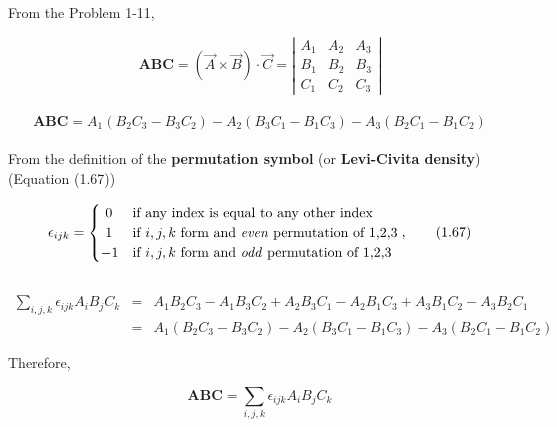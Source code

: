 \documentclass[a4paper]{article}
\begin{document}
\Large

From the Problem 1-11,

\begin{equation*}
	\mathbf{ABC} = (\vec{A} \times \vec{B}) \cdot \vec{C} = \left| \begin{array}{ccc} A_1 & A_2 & A_3 \\ B_1 & B_2 & B_3 \\ C_1 & C_2 & C_3 \end{array} \right|
\end{equation*}
\\
\begin{equation*}
	\mathbf{ABC} = A_1(B_2C_3-B_3C_2) - A_2(B_3C_1-B_1C_3) - A_3(B_2C_1-B_1C_2)
\end{equation*}
\\

From the definition of the \textbf{permutation symbol} (or \textbf{Levi-Civita density}) (Equation (1.67))

\begin{equation}
	\epsilon_{ijk} = 
	  \begin{cases}
	  	\ 0  & \text{if any index is equal to any other index} \\
	  	\ 1  & \text{if $i,j,k$ form and \textit{even} permutation of 1,2,3}\\
	  	-1 & \text{if $i,j,k$ form and \textit{odd} permutation of 1,2,3}
	  \end{cases},  \tag{1.67}
\end{equation}
\\

\begin{eqnarray*}
	\sum_{i,j,k} \epsilon_{ijk}A_iB_jC_k & = & A_1B_2C_3 - A_1B_3C_2 + A_2B_3C_1 - A_2B_1C_3 + A_3B_1C_2 - A_3B_2C_1 \\
	& = & A_1(B_2C_3-B_3C_2) - A_2(B_3C_1-B_1C_3) - A_3(B_2C_1-B_1C_2)
\end{eqnarray*}

Therefore,

\begin{equation*}
	\mathbf{ABC} = \sum_{i,j,k} \epsilon_{ijk}A_iB_jC_k
\end{equation*}
\end{document}
